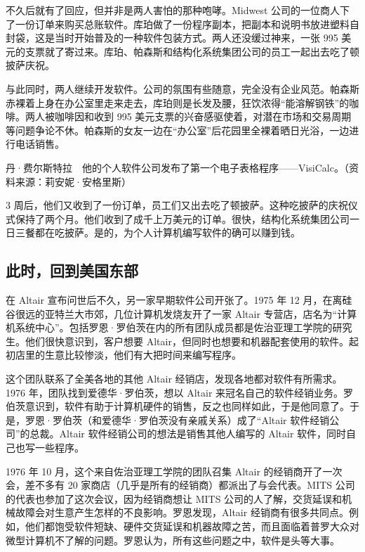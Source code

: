 \documentclass[12pt,UTF8]{ctexbook}
\begin{document}
不久后就有了回应，但并非是两人害怕的那种咆哮。Midwest 公司的一位商人下了一份订单来购买总账软件。库珀做了一份程序副本，把副本和说明书放进塑料自封袋，这是当时开始普及的一种软件包装方式。两人还没缓过神来，一张 995 美元的支票就了寄过来。库珀、帕森斯和结构化系统集团公司的员工一起出去吃了顿披萨庆祝。

与此同时，两人继续开发软件。公司的氛围有些随意，完全没有企业风范。帕森斯赤裸着上身在办公室里走来走去，库珀则是长发及腰，狂饮浓得“能溶解钢铁”的咖啡。两人被咖啡因和收到 995 美元支票的兴奋感驱使着，对潜在市场和交易周期等问题争论不休。帕森斯的女友一边在“办公室”后花园里全裸着晒日光浴，一边进行电话销售。



丹·费尔斯特拉　他的个人软件公司发布了第一个电子表格程序——VisiCalc。（资料来源：莉安妮·安格里斯）

3 周后，他们又收到了一份订单，员工们又出去吃了顿披萨。这种吃披萨的庆祝仪式保持了两个月。他们收到了成千上万美元的订单。很快，结构化系统集团公司一日三餐都在吃披萨。是的，为个人计算机编写软件的确可以赚到钱。





\subsection{此时，回到美国东部}


在 Altair 宣布问世后不久，另一家早期软件公司开张了。1975 年 12 月，在离硅谷很远的亚特兰大市郊，几位计算机发烧友开了一家 Altair 专营店，店名为“计算机系统中心”。包括罗恩·罗伯茨在内的所有团队成员都是佐治亚理工学院的研究生。他们很快意识到，客户想要 Altair，但同时也想要和机器配套使用的软件。起初店里的生意比较惨淡，他们有大把时间来编写程序。

这个团队联系了全美各地的其他 Altair 经销店，发现各地都对软件有所需求。1976 年，团队找到爱德华·罗伯茨，想以 Altair 来冠名自己的软件经销业务。罗伯茨意识到，软件有助于计算机硬件的销售，反之也同样如此，于是他同意了。于是，罗恩·罗伯茨（和爱德华·罗伯茨没有亲戚关系）成了“Altair 软件经销公司”的总裁。Altair 软件经销公司的想法是销售其他人编写的 Altair 软件，同时自己也写一些程序。

1976 年 10 月，这个来自佐治亚理工学院的团队召集 Altair 的经销商开了一次会，差不多有 20 家商店（几乎是所有的经销商）都派出了与会代表。MITS 公司的代表也参加了这次会议，因为经销商想让 MITS 公司的人了解，交货延误和机械故障会对生意产生怎样的不良影响。罗恩发现，Altair 经销商有很多共同点。例如，他们都饱受软件短缺、硬件交货延误和机器故障之苦，而且面临着普罗大众对微型计算机不了解的问题。罗恩认为，所有这些问题之中，软件是头等大事。
\end{document}
